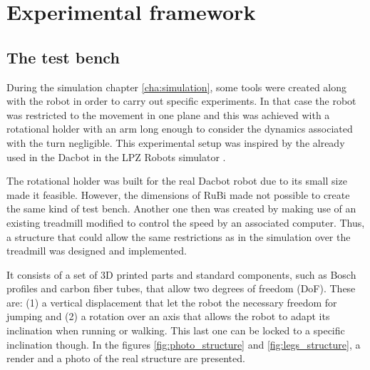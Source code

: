 \chapter{Experimental framework} %
\label{cha:experiments}

\section{The test bench} %
\label{sec:the_test_bench}
During the simulation chapter \ref{cha:simulation}, some tools were created along with the robot in order to carry out specific experiments.
In that case the robot was restricted to the movement in one plane and this was achieved with a rotational holder with an arm long enough to consider the dynamics associated with the turn negligible.
This experimental setup was inspired by the already used in the Dacbot \cite{dacbot1} in the LPZ Robots simulator \cite{lpzrobots}.

The rotational holder was built for the real Dacbot robot due to its small size made it feasible.
However, the dimensions of RuBi made not possible to create the same kind of test bench.
Another one then was created by making use of an existing treadmill modified to control the speed by an associated computer.
Thus, a structure that could allow the same restrictions as in the simulation over the treadmill was designed and implemented.

It consists of a set of 3D printed parts and standard components, such as Bosch profiles and carbon fiber tubes, that allow two degrees of freedom (DoF).
These are: (1) a vertical displacement that let the robot the necessary freedom for jumping and (2) a rotation over an axis that allows the robot to adapt its inclination when running or walking. 
This last one can be locked to a specific inclination though. In the figures \ref{fig:photo_structure} and \ref{fig:legs_structure}, a render and a photo of the real structure are presented.

